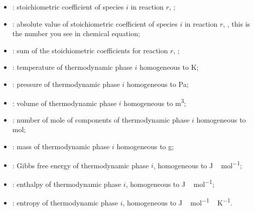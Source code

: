 \begin{itemize}
\item \scoef[i,r]:        stoichiometric coefficient of species $i$ in reaction $r$, \nounit;
\item \scoefabs[i,r]:     absolute value of stoichiometric coefficient of species $i$ in reaction $r$, \nounit, this is the number
                            you see in chemical equation;
\item \sumscoef[r]:       sum of the stoichiometric coefficients for reaction $r$, \nounit;
\item \Temp[i]:           temperature of thermodynamic  phase $i$ homogeneous to \unit{K}; 
\item \Press[i]:          pressure of thermodynamic  phase $i$ homogeneous to \unit{Pa}; 
\item \Vol[i]:            volume of thermodynamic  phase $i$ homogeneous to \unit{m^3}; 
\item \Mol[i]:            number of mole of components of thermodynamic  phase $i$ homogeneous to \unit{mol}; 
\item \Mass[i]:           mass of thermodynamic  phase $i$ homogeneous to \unit{g}; 
\item \Gibbs[i]:          Gibbs free energy of thermodynamic phase $i$, homogeneous to \unit{J\,mol^{-1}};
\item \Enth[i]:           enthalpy of thermodynamic phase $i$, homogeneous to \unit{J\,mol^{-1}};
\item \Entr[i]:           entropy of thermodynamic phase $i$, homogeneous to \unit{J\,mol^{-1}\,K^{-1}}.
\end{itemize}
%
